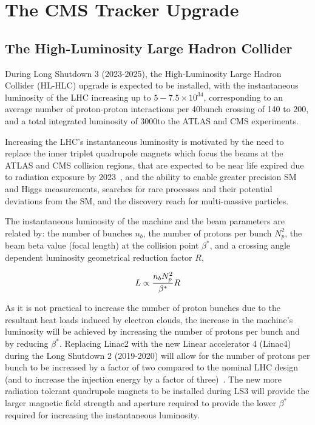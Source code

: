 \chapter{The CMS Tracker Upgrade}\label{chapter:tk-upgrade}
 
\section{The High-Luminosity Large Hadron Collider} \label{sec:hl-lhc}
During Long Shutdown 3 (2023-2025), the High-Luminosity Large Hadron Collider (HL-HLC) upgrade is expected to be installed, with the instantaneous luminosity of the LHC increasing up to $5-7.5 \times {10}^{34}$\percms, corresponding to an average number of proton-proton interactions per 40\MHz bunch crossing of 140 to 200, and a total integrated luminosity of 3000\fbinv to the ATLAS and CMS experiments.


Increasing the LHC's instantaneous luminosity is motivated by the need to replace the inner triplet quadrupole magnets which focus the beams at the ATLAS and CMS collision regions, that are expected to be near life expired due to radiation exposure by 2023~\cite{hl-lhc-prelim-design-report,CMSCollaboration:2015zni}, and the ability to enable greater precision SM and Higgs measurements, searches for rare processes and their potential deviations from the SM, and the discovery reach for multi-\TeV massive particles.

The instantaneous luminosity of the machine and the beam parameters are related by: the number of bunches $n_{b}$, the number of protons per bunch $N^{2}_{p}$, the beam beta value (focal length) at the collision point $\beta^{*}$, and a crossing angle dependent luminosity geometrical reduction factor $R$,

\begin{equation}
L \propto \frac{n_{b}N^{2}_{p}}{\beta^{*}} R \\
\label{eq:machineLumi}
\end{equation}

As it is not practical to increase the number of proton bunches due to the resultant heat loads induced by electron clouds, the increase in the machine's luminosity will be achieved by increasing the number of protons per bunch and by  reducing $\beta^{*}$.
Replacing Linac2 with the new Linear accelerator 4 (Linac4) during the Long Shutdown 2 (2019-2020) will allow for the number of protons per bunch to be increased by a factor of two compared to the nominal LHC design (and to increase the injection energy by a factor of three)~\cite{linac4}.
The new more radiation tolerant quadrupole magnets to be installed during LS3 will provide the larger magnetic field strength and aperture required to provide the lower $\beta^{*}$ required for increasing the instantaneous luminosity. 

